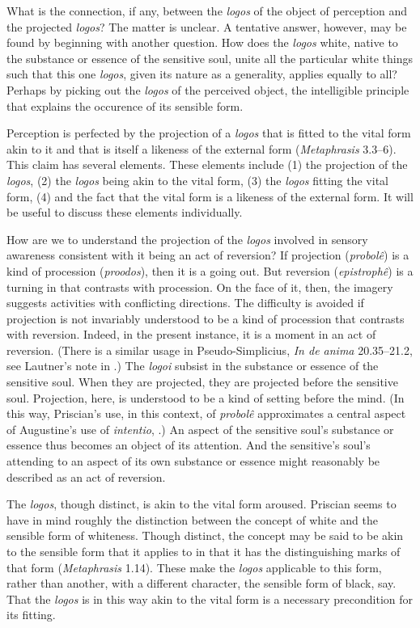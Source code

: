 \documentclass[12pt]{article}
\begin{document}
What is the connection, if any, between the \emph{logos} of the object of perception and the projected \emph{logos}? The matter is unclear. A tentative answer, however, may be found by beginning with another question. How does the \emph{logos} white, native to the substance or essence of the sensitive soul, unite all the particular white things such that this one \emph{logos}, given its nature as a generality, applies equally to all? Perhaps by picking out the \emph{logos} of the perceived object, the intelligible principle that explains the occurence of its sensible form.

Perception is perfected by the projection of a \emph{logos} that is fitted to the vital form akin to it and that is itself a likeness of the external form (\emph{Metaphrasis} 3.3--6). This claim has several elements. These elements include (1) the projection of the \emph{logos}, (2) the \emph{logos} being akin to the vital form, (3) the \emph{logos} fitting the vital form, (4) and the fact that the vital form is a likeness of the external form. It will be useful to discuss these elements individually.

How are we to understand the projection of the \emph{logos} involved in sensory awareness consistent with it being an act of reversion? If projection (\emph{probolê}) is a kind of procession (\emph{proodos}), then it is a going out. But reversion (\emph{epistrophê}) is a turning in that contrasts with procession. On the face of it, then, the imagery suggests activities with conflicting directions. The difficulty is avoided if projection is not invariably understood to be a kind of procession that contrasts with reversion. Indeed, in the present instance, it is a moment in an act of reversion. (There is a similar usage in Pseudo-Simplicius, \emph{In de anima} 20.35--21.2, see Lautner's note in \citealt[164--165 n.94]{Urmson:2013vf}.) The \emph{logoi} subsist in the substance or essence of the sensitive soul. When they are projected, they are projected before the sensitive soul. Projection, here, is understood to be a kind of setting before the mind. (In this way, Priscian's use, in this context, of \emph{probolê} approximates a central aspect of Augustine's use of \emph{intentio}, \citealt[84--87]{ODaly:1987fq}.) An aspect of the sensitive soul's substance or essence thus becomes an object of its attention. And the sensitive's soul's attending to an aspect of its own substance or essence might reasonably be described as an act of reversion.

The \emph{logos}, though distinct, is akin to the vital form aroused. Priscian seems to have in mind roughly the distinction between the concept of white and the sensible form of whiteness. Though distinct, the concept may be said to be akin to the sensible form that it applies to in that it has the distinguishing marks of that form (\emph{Metaphrasis} 1.14). These make the \emph{logos} applicable to this form, rather than another, with a different character, the sensible form of black, say. That the \emph{logos} is in this way akin to the vital form is a necessary precondition for its fitting.
\end{document}

